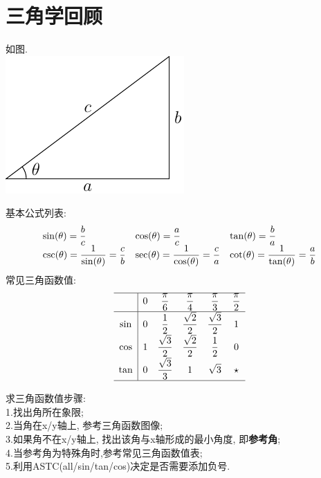 \chapter{三角学回顾}
如图.\\
\includegraphics{triangel.pdf}

基本公式列表:\\
\begin{equation*}
\begin{array}{l l l}
    \displaystyle\sin(\theta)=\frac{b}{c} & \displaystyle\cos(\theta)=\frac{a}{c} & \displaystyle\tan(\theta)=\frac{b}{a}\\
    \displaystyle\csc(\theta)=\frac{1}{\sin(\theta)}=\frac{c}{b} & \displaystyle\sec(\theta)=\frac{1}{\cos(\theta)}=\frac{c}{a} & \displaystyle\cot(\theta)=\frac{1}{\tan(\theta)}=\frac{a}{b}
\end{array}
\end{equation*}
常见三角函数值:
\begin{equation*}
\begin{array}{>{\displaystyle}c|>{\displaystyle}c >{\displaystyle}c >{\displaystyle}c >{\displaystyle}c >{\displaystyle}c}
\hline
    & 0 & \frac{\pi}{6} & \frac{\pi}{4} & \frac{\pi}{3} & \frac{\pi}{2}\\[1ex]
\hline
    \sin & 0 & \frac{1}{2} & \frac{\sqrt{2}}{2} & \frac{\sqrt{3}}{2} & 1\\[1ex]
    \cos & 1 & \frac{\sqrt{3}}{2} & \frac{\sqrt{2}}{2} & \frac{1}{2} & 0\\[1ex]
    \tan & 0 & \frac{\sqrt{3}}{3} & 1 & \sqrt{3} & \star\\[1ex]
\hline
\end{array}
\end{equation*}

求三角函数值步骤:\\
1.找出角所在象限;\\
2.当角在x/y轴上, 参考三角函数图像;\\
3.如果角不在x/y轴上, 找出该角与x轴形成的最小角度, 即\textbf{参考角};\\
4.当参考角为特殊角时,参考常见三角函数值表;\\
5.利用ASTC(all/sin/tan/cos)决定是否需要添加负号.

